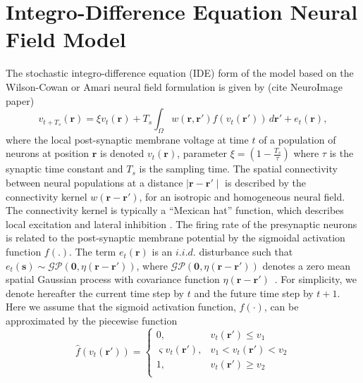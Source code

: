 \documentclass[journal,a4paper]{IEEEtran}
\begin{document}
\section{Integro-Difference Equation Neural Field Model}
The stochastic  integro-difference equation (IDE) form of the model based on the Wilson-Cowan \cite{Wilson1973} or Amari neural field \cite{Amari1977} formulation is given by (cite NeuroImage paper)
\begin{equation}
	v_{t+T_s}\left(\mathbf{r}\right) = 
	\xi v_t\left(\mathbf{r}\right) + 
	T_s \int_\Omega { 
	    w\left(\mathbf{r},\mathbf{r'}\right)
	    f\left(v_t\left(\mathbf{r}'\right)\right) 
	\, d\mathbf{r}'} 
	+ e_t\left(\mathbf{r}\right), 
\end{equation}
where the local post-synaptic membrane voltage at time $t$ of a population of neurons at position $\mathbf r$ is denoted $v_t\left(\mathbf r\right)$, parameter $\xi=\left(1-\frac{ T_s}{\tau}\right)$ where $\tau$ is the synaptic time constant and $T_s$ is the sampling time. The spatial connectivity between neural populations at a distance $\mid\mathbf{r}-\mathbf{r'}\mid$ is described by the connectivity kernel $w\left(\mathbf{r}-\mathbf{r}'\right)$, for an isotropic and homogeneous neural field. The connectivity kernel is typically a ``Mexican hat'' function, which describes local excitation and lateral inhibition \cite{Amari1977}. The firing rate of the presynaptic neurons is related to the post-synaptic membrane potential by the sigmoidal activation function $f\left(.\right)$. The term $e_t(\mathbf r)$ is an $i.i.d.$ disturbance such that $e_t(\mathbf{s})\sim\mathcal{GP}(\mathbf 0,\eta(\mathbf{r}-\mathbf{r'}))$, where $\mathcal{GP}(\mathbf 0,\eta(\mathbf{r}-\mathbf{r'}))$  denotes a zero mean spatial Gaussian process with covariance function $\eta(\mathbf{r}-\mathbf{r'})$~\cite{Rasmussen2005}. For simplicity, we denote hereafter the current time step by $t$ and the future time step by $t+1$. Here we assume that the sigmoid activation function, $f(\cdot)$, can be approximated by the piecewise function
\begin{equation}\label{eq:PiecewiseSigmoid} 
	\hat{f}(v_t(\mathbf{r}')) = \left\{ \begin{array}{ll}
		0, & v_t(\mathbf{r}') \le v_1 \\
		\varsigma v_t(\mathbf{r}'), &  v_1 < v_t(\mathbf{r}') < v_2 \\
		1, & v_t(\mathbf{r}') \ge v_2 \\ 
		\end{array}\right.
\end{equation}
\end{document}
